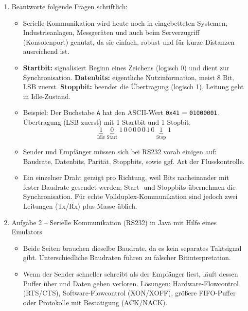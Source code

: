 \documentclass[11pt,a4paper,oneside]{article}
\newcounter{loesung}[section]
\renewcommand{\theloesung}{\thesection.\arabic{loesung}}
\newenvironment{loesung}[1]{%
	\refstepcounter{loesung}%
	\begin{tcolorbox}[termbase,
		colframe=loesungColor!50!black,
		boxed title style={interior style={left color=loesungColor, right color=loesungColor!70!black}},
		title={Lösung~\theloesung: #1}]%
	}{\end{tcolorbox}}
\begin{document}
	\begin{loesung}{Serielle Kommunikation}
		\begin{enumerate}
			\item Beantworte folgende Fragen schriftlich:
			\begin{itemize}
				\item Serielle Kommunikation wird heute noch in eingebetteten Systemen, Industrieanlagen, Messgeräten und auch beim Serverzugriff (Konsolenport) genutzt, da sie einfach, robust und für kurze Distanzen ausreichend ist.
				
				\item \textbf{Startbit:} signalisiert Beginn eines Zeichens (logisch 0) und dient zur Synchronisation.  
				\textbf{Datenbits:} eigentliche Nutzinformation, meist 8 Bit, LSB zuerst.  
				\textbf{Stoppbit:} beendet die Übertragung (logisch 1), Leitung geht in Idle-Zustand.
				
				\item Beispiel: Der Buchstabe \texttt{A} hat den ASCII-Wert \texttt{0x41} = \texttt{01000001}.  
				Übertragung (LSB zuerst) mit 1 Startbit und 1 Stopbit:  
				\[
				\underbrace{1}_{\text{Idle}} \;
				\underbrace{0}_{\text{Start}} \;
				1\,0\,0\,0\,0\,0\,1\,0 \;
				\underbrace{1}_{\text{Stop}} \;
				1
				\]
				
				\item Sender und Empfänger müssen sich bei RS232 vorab einigen auf: Baudrate, Datenbits, Parität, Stoppbits, sowie ggf. Art der Flusskontrolle.
				
				\item Ein einzelner Draht genügt pro Richtung, weil Bits nacheinander mit fester Baudrate gesendet werden; Start- und Stoppbits übernehmen die Synchronisation. Für echte Vollduplex-Kommunikation sind jedoch zwei Leitungen (Tx/Rx) plus Masse üblich.
			\end{itemize}
			
			\item Aufgabe 2 – Serielle Kommunikation (RS232) in Java mit Hilfe eines Emulators
			\begin{itemize}
				\item Beide Seiten brauchen dieselbe Baudrate, da es kein separates Taktsignal gibt. Unterschiedliche Baudraten führen zu falscher Bitinterpretation.
				
				\item Wenn der Sender schneller schreibt als der Empfänger liest, läuft dessen Puffer über und Daten gehen verloren.  
				Lösungen: Hardware-Flowcontrol (RTS/CTS), Software-Flowcontrol (XON/XOFF), größere FIFO-Puffer oder Protokolle mit Bestätigung (ACK/NACK).
			\end{itemize}
		\end{enumerate}
	\end{loesung}
	
\end{document}
